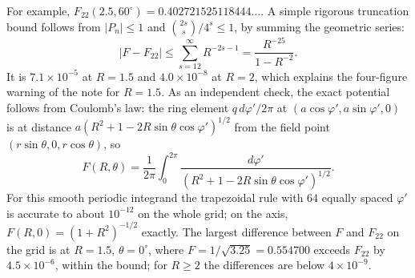 For example, $F_{22}(2.5,60^\circ)=0.402721525118444\ldots$.
A simple rigorous truncation bound follows from $|P_n|\le1$ and
$\binom{2s}{s}/4^s\le1$, by summing the geometric series:
\[
|F-F_{22}|\le\sum_{s=12}^\infty R^{-2s-1}
=\frac{R^{-25}}{1-R^{-2}}.
\]
It is $7.1\times10^{-5}$ at $R=1.5$ and $4.0\times10^{-8}$ at $R=2$,
which explains the four-figure warning of the note for $R=1.5$.
As an independent check, the exact potential follows from Coulomb's
law: the ring element $q\,d\varphi'/2\pi$ at
$(a\cos\varphi',a\sin\varphi',0)$ is at distance
$a(R^2+1-2R\sin\theta\cos\varphi')^{1/2}$ from the field point
$(r\sin\theta,0,r\cos\theta)$, so
\[
F(R,\theta)=\frac1{2\pi}\int_0^{2\pi}
\frac{d\varphi'}{(R^2+1-2R\sin\theta\cos\varphi')^{1/2}}.
\]
For this smooth periodic integrand the trapezoidal rule with 64 equally
spaced $\varphi'$ is accurate to about $10^{-12}$ on the whole grid; on
the axis, $F(R,0)=(1+R^2)^{-1/2}$ exactly. The largest difference
between $F$ and $F_{22}$ on the grid is at $R=1.5$, $\theta=0^\circ$,
where
$F=1/\sqrt{3.25}=0.554700$ exceeds $F_{22}$ by $4.5\times10^{-6}$,
within the bound; for $R\ge2$ the differences are below
$4\times10^{-9}$.

